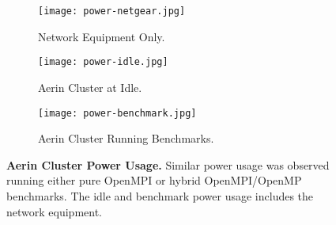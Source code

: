 \begin{figure}[]
	\begin{subfigure}{1.0\textwidth}
		\centering
		\texttt{[image: power-netgear.jpg]}
		\caption{Network Equipment Only.}
		\label{fig:subim1}
	\end{subfigure}
	\par\bigskip
	\begin{subfigure}{1.0\textwidth}
		\centering
		\texttt{[image: power-idle.jpg]}
		\caption{Aerin Cluster at Idle.}
		\label{fig:subim2}
	\end{subfigure}
	\par\bigskip
	\begin{subfigure}{1.0\textwidth}
		\centering
		\texttt{[image: power-benchmark.jpg]}
		\caption{Aerin Cluster Running Benchmarks.}
		\label{fig:subim2}
	\end{subfigure}
\caption{\textbf{Aerin Cluster Power Usage.} Similar power usage was observed running either pure OpenMPI or hybrid OpenMPI/OpenMP benchmarks. The idle and benchmark power usage includes the network equipment.}
\label{fig:image2}
\end{figure}






